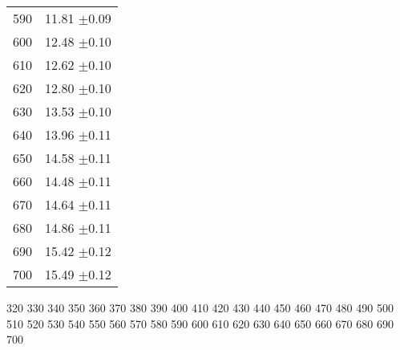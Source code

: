 \begin{table}[H]
\begin{tabular}{c c}
      590 &        11.81   $\pm$0.09 \\
      600 &        12.48   $\pm$0.10 \\
      610 &        12.62   $\pm$0.10 \\
      620 &        12.80   $\pm$0.10 \\
      630 &        13.53   $\pm$0.10 \\
      640 &        13.96   $\pm$0.11 \\
      650 &        14.58   $\pm$0.11 \\
      660 &        14.48   $\pm$0.11 \\
      670 &        14.64   $\pm$0.11 \\
      680 &        14.86   $\pm$0.11 \\
      690 &        15.42   $\pm$0.12 \\
      700 &        15.49   $\pm$0.12 \\
    \bottomrule
  \end{tabular}
\end{table}

320
330
340
350
360
370
380
390
400
410
420
430
440
450
460
470
480
490
500
510
520
530
540
550
560
570
580
590
600
610
620
630
640
650
660
670
680
690
700
